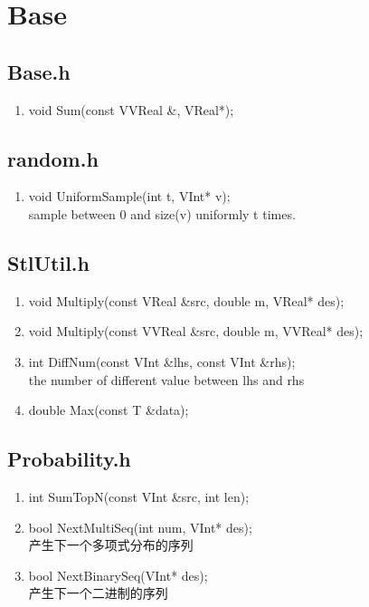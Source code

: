 \chapter{Base}
\section{Base.h}
\begin{enumerate}
\item void Sum(const VVReal \&, VReal*);
\end{enumerate}
\section{random.h}

\begin{enumerate}
\item void UniformSample(int t, VInt* v);
\\sample between 0 and size(v) uniformly t times.
\end{enumerate}

\section{StlUtil.h}
\begin{enumerate}
\item void Multiply(const VReal \&src, double m, VReal* des);
\item void Multiply(const VVReal \&src, double m, VVReal* des);
\item int DiffNum(const VInt \&lhs, const VInt \&rhs);
\\ the number of different value between lhs and rhs
\item double Max(const T \&data);
\end{enumerate}

\section{Probability.h}
\begin{enumerate}
\item int SumTopN(const VInt \&src, int len);
\item bool NextMultiSeq(int num, VInt* des);
\\ 产生下一个多项式分布的序列
\item bool NextBinarySeq(VInt* des);
\\ 产生下一个二进制的序列
\end{enumerate}

